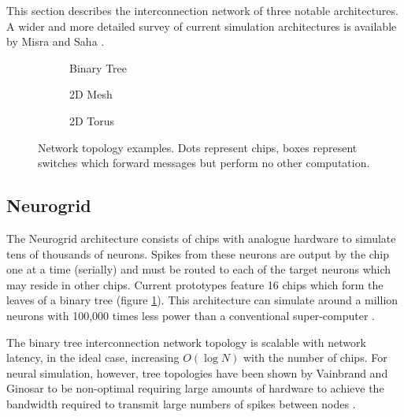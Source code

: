 	This section describes the interconnection network of three notable
	architectures. A wider and more detailed survey of current simulation
	architectures is available by Misra and Saha \cite{misra10}.
	
	\begin{figure}
		
		\center
		\begin{subfigure}[b]{0.32\textwidth}
			\center
			
			\caption{Binary Tree}
			\label{fig:binary-tree}
		\end{subfigure}
		\begin{subfigure}[b]{0.32\textwidth}
			\center
			
			\caption{2D Mesh}
			\label{fig:mesh}
		\end{subfigure}
		\begin{subfigure}[b]{0.32\textwidth}
			\center
			
			\caption{2D Torus}
			\label{fig:torus}
		\end{subfigure}
		
		\caption{Network topology examples. Dots represent chips, boxes represent
		switches which forward messages but perform no other computation.}
		\label{fig:network-topology-examples}
		
	\end{figure}
	
	\subsection{Neurogrid}
		
		The Neurogrid architecture consists of chips with analogue hardware to
		simulate tens of thousands of neurons. Spikes from these neurons are output
		by the chip one at a time (serially) and must be routed to each of the
		target neurons which may reside in other chips. Current prototypes feature
		16 chips which form the leaves of a binary tree (figure
		\ref{fig:binary-tree}). This architecture can simulate around a million
		neurons with 100,000 times less power than a conventional super-computer
		\cite{choudhary12}.
		
		The binary tree interconnection network topology is scalable with network
		latency, in the ideal case, increasing $O(\log{N})$ with the number of
		chips. For neural simulation, however, tree topologies have been shown by
		Vainbrand and Ginosar to be non-optimal requiring large amounts of hardware
		to achieve the bandwidth required to transmit large numbers of spikes
		between nodes \cite{vainbrand11}.
	
